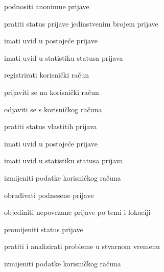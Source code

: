\begin{packed_enum}
	\item  {}

	\begin{packed_enum}

		\item podnositi anonimne prijave
		\item pratiti status prijave jedinstvenim brojem prijave
		\item imati uvid u postojeće prijave
		\item imati uvid u statistiku statusa prijava
		\item registrirati korisnički račun


	\end{packed_enum}

	\item  {}

	\begin{packed_enum}

		\item prijaviti se na korisnički račun
		\item odjaviti se s korisničkog računa
		\item pratiti status vlastitih prijava
		\item imati uvid u postojeće prijave
		\item imati uvid u statistiku statusa prijava
		\item izmijeniti podatke korisničkog računa

	\end{packed_enum}

	\item {}

	\begin{packed_enum}

		\item obrađivati podnesene prijave
		\item objediniti nepovezane prijave po temi i lokaciji
		\item promijeniti status prijave
		\item pratiti i analizirati probleme u stvarnom vremenu
		\item izmijeniti podatke korisničkog računa

	\end{packed_enum}

	\item {}


\end{packed_enum}
